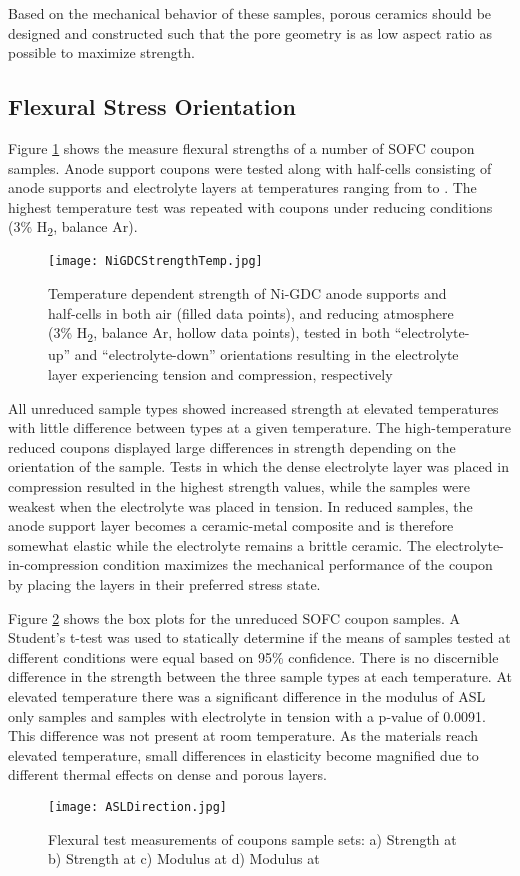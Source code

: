 Based on the mechanical behavior of these samples, porous ceramics should be designed and constructed such that the pore geometry is as low aspect ratio as possible to maximize strength.

\subsection{Flexural Stress Orientation}

Figure \ref{fig:NiGDCHalfCells} shows the measure flexural strengths of a number of SOFC coupon samples.
Anode support coupons were tested along with half-cells consisting of anode supports and electrolyte layers at temperatures ranging from  to .
The highest temperature test was repeated with coupons under reducing conditions (3\% H\textsubscript{2}, balance Ar).
\begin{figure}
    \texttt{[image: NiGDCStrengthTemp.jpg]}
    \caption{Temperature dependent strength of Ni-GDC anode supports and half-cells in both air (filled data points), and reducing atmosphere (3\% H\textsubscript{2}, balance Ar, hollow data points), tested in both ``electrolyte-up'' and ``electrolyte-down'' orientations resulting in the electrolyte layer experiencing tension and compression, respectively}
    \label{fig:NiGDCHalfCells}
\end{figure}

All unreduced sample types showed increased strength at elevated temperatures with little difference between types at a given temperature.
The high-temperature reduced coupons displayed large differences in strength depending on the orientation of the sample.
Tests in which the dense electrolyte layer was placed in compression resulted in the highest strength values, while the samples were weakest when the electrolyte was placed in tension.
In reduced samples, the anode support layer becomes a ceramic-metal composite and is therefore somewhat elastic while the electrolyte remains a brittle ceramic.
The electrolyte-in-compression condition maximizes the mechanical performance of the coupon by placing the layers in their preferred stress state.

Figure \ref{fig:ASLDirection} shows the box plots for the unreduced SOFC coupon samples.
A Student's t-test was used to statically determine if the means of samples tested at different conditions were equal based on 95\% confidence.
There is no discernible difference in the strength between the three sample types at each temperature.
At elevated temperature there was a significant difference in the modulus of ASL only samples and samples with electrolyte in tension with a p-value of 0.0091.
This difference was not present at room temperature.
As the materials reach elevated temperature, small differences in elasticity become magnified due to different thermal effects on dense and porous layers.
\begin{figure}
    \texttt{[image: ASLDirection.jpg]}
    \caption{Flexural test measurements of coupons sample sets: a) Strength at  b) Strength at  c) Modulus at  d) Modulus at }
    \label{fig:ASLDirection}
\end{figure}

